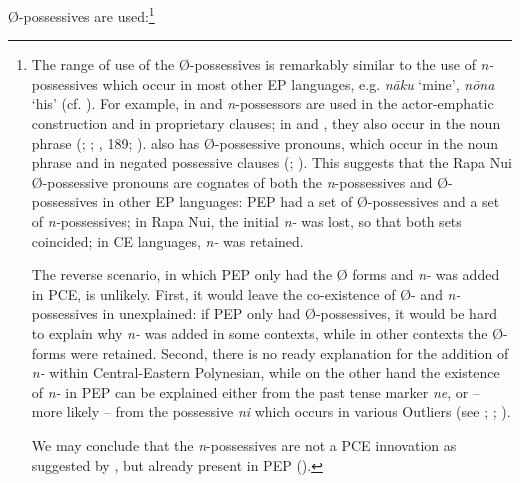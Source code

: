 Ø-possessives are used:\footnote{\label{fn:290}The range of use of the Ø-possessives is remarkably similar to the use of \textit{n-}possessives which occur in most other EP languages, e.g.  \textit{nāku} ‘mine’, \textit{nōna} ‘his’ (cf. \citealt[316]{Wilson2012}). For example, in  and  \textit{n}{}-possessors are used in the actor-emphatic construction and in proprietary clauses; in  and , they also occur in the noun phrase (\citealt[208–209]{Bauer1993}; \citealt{Harlow2000}; \citealt[175–176]{LazardPeltzer2000}, 189; \citealt[349]{Cook2000}).  also has Ø-possessive pronouns, which occur in the noun phrase and in negated possessive clauses (\citealt[202, 381]{Bauer1993}; \citealt[359]{Harlow2000}). This suggests that the Rapa Nui Ø-possessive pronouns are cognates of both the \textit{n}{}-possessives and Ø-possessives in other EP languages: PEP had a set of Ø-possessives and a set of \textit{n-}possessives; in Rapa Nui, the initial \textit{n-} was lost, so that both sets coincided; in CE languages, \textit{n-} was retained. 

The reverse scenario, in which PEP only had the Ø forms and \textit{n-} was added in PCE, is unlikely. First, it would leave the co-existence of Ø- and \textit{n-}possessives in  unexplained: if PEP only had Ø-possessives, it would be hard to explain why \textit{n-} was added in some contexts, while in other contexts the Ø-forms were retained. Second, there is no ready explanation for the addition of \textit{n-} within Central-Eastern Polynesian, while on the other hand the existence of \textit{n-} in PEP can be explained either from the past tense marker \textit{ne}, or – more likely – from the possessive \textit{ni} which occurs in various Outliers (see \citealt[50]{Wilson1982}; \citealt[101]{Wilson1985}; \citealt[263]{Clark2000Possessive}).

We may conclude that the \textit{n}{}-possessives are not a PCE innovation as suggested by \citet[12]{Green1985}, but already present in PEP ().}

